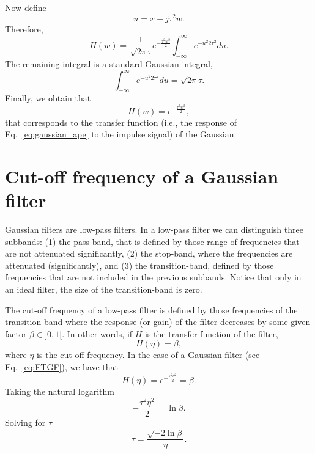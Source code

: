 \documentclass{article}
\begin{document}
Now define
\begin{equation*}
  u = x + j\tau^2w.
\end{equation*}
Therefore,
\begin{equation*}
  H(w) = \frac{1}{\sqrt{2\pi}\tau}e^{-\frac{\tau^2w^2}{2}}\int_{-\infty}^{\infty}e^{{-u^2}{2\tau^2}}du.
\end{equation*}
The remaining integral is a standard Gaussian integral,
\begin{equation*}
  \int_{-\infty}^{\infty}e^{{-u^2}{2\tau^2}}du = \sqrt{2\pi}\tau.
\end{equation*}
Finally, we obtain that
\begin{equation}
  H(w) = e^{-\frac{\tau^2w^2}{2}},
  \label{eq:FTGF}
\end{equation}
that corresponds to the transfer function (i.e., the response of
Eq.~\ref{eq:gaussian_ape} to the impulse signal) of the Gaussian.


\section{Cut-off frequency of a Gaussian filter}
\label{ape:tau_VS_eta}

Gaussian filters are low-pass filters. In a low-pass filter we can
distinguish three subbands: (1) the pass-band, that is defined by
those range of frequencies that are not attenuated significantly, (2)
the stop-band, where the frequencies are attenuated (significantly),
and (3) the transition-band, defined by those frequencies that are not
included in the previous subbands. Notice that only in an ideal
filter, the size of the transition-band is zero.

The cut-off frequency of a low-pass filter is defined by those
frequencies of the transition-band where the response (or gain) of the
filter decreases by some given factor $\beta\in]0,1[$. In other words,
if $H$ is the transfer function of the filter,
\begin{equation}
  H(\eta) = \beta,
\end{equation}
where $\eta$ is the cut-off frequency. In the case of a Gaussian
filter (see Eq.~\ref{eq:FTGF}), we have that
\begin{equation*}
  H(\eta) = e^{-\frac{\tau^2\eta^2}{2}} = \beta.
\end{equation*}
Taking the natural logarithm
\begin{equation*}
  -\frac{\tau^2\eta^2}{2} = \ln\beta.
\end{equation*}
Solving for $\tau$
\begin{equation}
  \tau = \frac{\sqrt{-2\ln\beta}}{\eta}.
  \label{eq:tau_VS_eta}
\end{equation}
\end{document}
